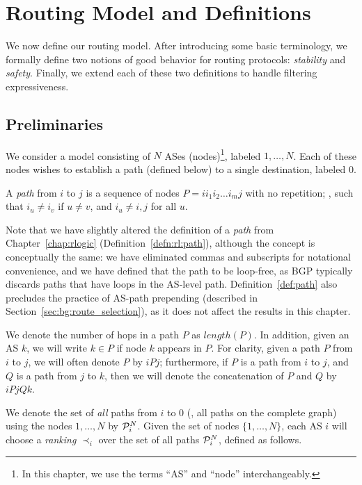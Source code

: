\section{Routing Model and Definitions}\label{sec:notation}
We now define our routing model.  After introducing some basic
terminology, we formally define two notions of good behavior for routing
protocols: {\em stability} and {\em safety}.  Finally, we extend each of
these two definitions to handle filtering expressiveness.

\subsection{Preliminaries}

We consider a model consisting of $N$ ASes (nodes)\footnote{ In this
chapter, we use the terms ``AS'' and ``node'' interchangeably.}, labeled
$1,\ldots,N$.  Each of these nodes wishes to establish a path (defined
below) to a single destination, labeled $0$.

\begin{defn}[Path]
\label{def:path}
A {\em path} from $i$ to $j$ is a sequence of nodes $P = i
i_1 i_2 \ldots i_m j$ with no repetition; \ie, such that $i_u \neq i_v$ if
$u \neq v$, and $i_u \neq i,j$ for all $u$.
\end{defn}

Note that we have slightly altered the definition of a {\em path} from
Chapter~\ref{chap:rlogic} (Definition~\ref{defn:rl:path}), although the
concept is conceptually the same: we have eliminated commas and
subscripts for notational convenience, and we have defined that the path
to be loop-free, as BGP typically discards paths that have loops in the
AS-level path.  Definition~\ref{def:path} also precludes the practice of
AS-path prepending (described in Section~\ref{sec:bg:route_selection}),
as it does not affect the results in this chapter.

We denote the number of hops in a path $P$ as $length(P)$.  In addition,
given an AS $k$, we will write $k \in P$ if node $k$ appears in $P$.
For clarity, given a path $P$ from $i$ to $j$, we will often denote $P$
by $iPj$; furthermore, if $P$ is a path from $i$ to $j$, and $Q$ is a
path from $j$ to $k$, then we will denote the concatenation of $P$ and
$Q$ by $iPjQk$.

We denote the set of {\em all} paths from $i$ to $0$ (\ie, all paths
on the complete
graph) using the nodes 
$1,\ldots,N$ by $\P_i^N$.  Given the set of nodes $\{1,\ldots,N\}$, each
AS $i$ will choose a {\em ranking} $\prec_i$ over the set of all paths
$\P_i^N$, defined as follows.

